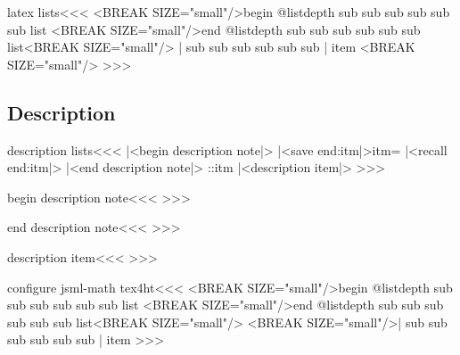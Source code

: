 \<latex lists\><<<
   {<BREAK SIZE="small"/>begin \ifcase\csname @listdepth\endcsname
          \or \or sub \or sub sub \or sub sub sub \else\fi
      list}
   {<BREAK SIZE="small"/>end \ifcase\csname @listdepth\endcsname
         \or sub \or sub sub \or sub sub sub \else\fi
      list<BREAK SIZE="small"/>}
   {|%
          \or \or sub \or sub sub \or sub sub sub \else\fi|%
       item <BREAK SIZE="small"/>}
>>>

\subsection{Description}


\<description lists\><<<
%
   {\EndP
      |<begin description note|>%
      |<save end:itm|>\global\let\end:itm=\empty}
   {|<recall end:itm|>\EndP{}%
    |<end description note|>%
    \ShowPar}
   {\end:itm \global\def\end:itm{\EndP\HCode{</dd>}}|<description item|>\bgroup \bf}
   {\egroup\EndP{}}
>>>







\<begin description note\><<<
%
>>>


\<end description note\><<<
%
>>>

\<description item\><<<
%
>>>


\<configure jsml-math tex4ht\><<<
   {<BREAK SIZE="small"/>begin \ifcase\csname @listdepth\endcsname
          \or \or sub \or sub sub \or sub sub sub \else\fi
       list}
   {<BREAK SIZE="small"/>end \ifcase\csname @listdepth\endcsname
         \or sub \or sub sub \or sub sub sub \else\fi
       list<BREAK SIZE="small"/>}
   {<BREAK SIZE="small"/>|%
          \or \or sub \or sub sub \or sub sub sub \else\fi|%
       item}
>>>







